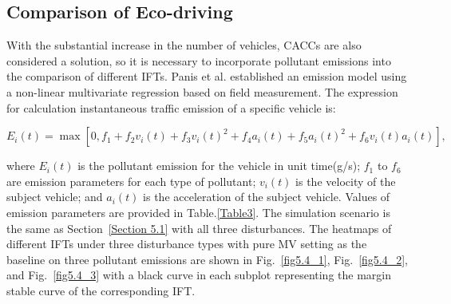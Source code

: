 \documentclass[journal]{IEEEtran}
\begin{document}
\subsection{Comparison of Eco-driving}
\label{Section 5.5}
With the substantial increase in the number of vehicles, CACCs are also considered a solution, so it is necessary to incorporate pollutant emissions into the comparison of different IFTs. Panis et al.\citep{panis2006modelling} established an emission model using a non-linear multivariate regression based on field measurement. The expression for calculation instantaneous traffic emission of a specific vehicle is:

\begin{small}
\begin{equation}
E_{i}(t)=\max \left[0, f_{1}\!+\!f_{2} v_{i}(t)\!+\!f_{3} v_{i}(t)^{2}\!+\!f_{4} a_{i}(t)\!+\!f_{5} a_{i}(t)^{2}\!+\!f_{6} v_{i}(t) a_{i}(t)\right],
\end{equation}
\end{small}

where $E_i (t)$ is the pollutant emission for the vehicle in unit time(g/s); $f_1$ to $f_6$ are emission parameters for each type of pollutant; $v_i (t)$ is the velocity of the subject vehicle; and $a_i (t)$ is the acceleration of the subject vehicle. Values of emission parameters are provided in Table.\ref{Table3}. The simulation scenario is the same as Section~\ref{Section 5.1} with all three disturbances. The heatmaps of different IFTs under three disturbance types with pure MV setting as the baseline on three pollutant emissions are shown in Fig.~\ref{fig5.4_1}, Fig.~\ref{fig5.4_2}, and Fig.~\ref{fig5.4_3} with a black curve in each subplot representing the margin stable curve of the corresponding IFT.

\begin{table}
    \centering
    \setlength{\abovecaptionskip}{0pt}
    \setlength{\belowcaptionskip}{10pt}%
    \caption{~Parameters for Emission Model of Petrol Car.}
\label{Table3}
\end{table}
\end{document}
